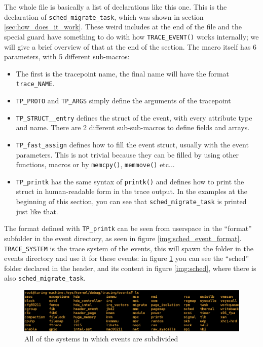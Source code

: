 \documentclass[10pt]{book}
\begin{document}
The whole file is basically a list of declarations like this one. This is the declaration of \verb|sched_migrate_task|, which was shown in section \ref{sec:how_does_it_work}. These weird includes at the end of the file and the special guard have something to do with how \verb|TRACE_EVENT()| works internally; we will give a brief overview of that at the end of the section. The macro itself has 6 parameters, with 5 different sub-macros:
\begin{itemize}
    \item The first is the tracepoint name, the final name will have the format \verb|trace_NAME|.
    \item \verb|TP_PROTO| and \verb|TP_ARGS| simply define the arguments of the tracepoint
    \item \verb|TP_STRUCT__entry| defines the struct of the event, with every attribute type and name. There are 2 different sub-sub-macros to define fields and arrays.
    \item \verb|TP_fast_assign| defines how to fill the event struct, usually with the event parameters. This is not trivial because they can be filled by using other functions, macros or by \verb|memcpy()|, \verb|memmove()| etc...
    \item \verb|TP_printk| has the same syntax of \verb|printk()| and defines how to print the struct in human-readable form in the trace output. In the examples at the beginning of this section, you can see that \verb|sched_migrate_task| is printed just like that.
\end{itemize}

The format defined with \verb|TP_printk| can be seen from userspace in the ``format'' subfolder in the event directory, as seen in figure \ref{img:sched_event_format}. \verb|TRACE_SYSTEM| is the trace system of the events, this will spawn the folder in the events directory and use it for these events: in figure \ref{img:systems} you can see the ``sched'' folder declared in the header, and its content in figure \ref{img:sched}, where there is also \verb|sched_migrate_task|. 
\begin{figure}[ht]
\includegraphics[width=\textwidth]{images/shell_trace_systems.png} 
\caption{All of the systems in which events are subdivided}
\label{img:systems}
\end{figure}
\end{document}
